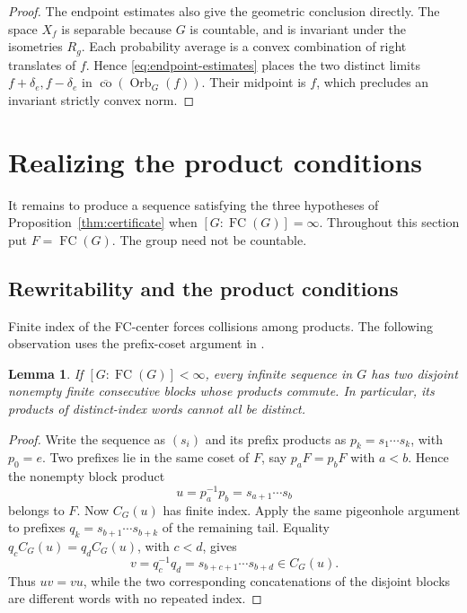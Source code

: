 \documentclass[11pt,letterpaper]{amsart}
\newtheorem{lemma}[theorem]{Lemma}
\theoremstyle{definition}
\theoremstyle{remark}
\DeclareMathOperator{\co}{co}
\DeclareMathOperator{\Orb}{Orb}
\DeclareMathOperator{\FC}{FC}
\begin{document}
\begin{proof}
The endpoint estimates also give the geometric conclusion directly.
The space $X_f$ is separable because $G$ is countable, and is invariant
under the isometries $R_g$. Each probability average is a convex
combination of right translates of $f$. Hence \eqref{eq:endpoint-estimates}
places the two distinct limits $f+\delta_e,f-\delta_e$ in
$\overline{\co}(\Orb_G(f))$. Their midpoint is $f$, which precludes
an invariant strictly convex norm.
\end{proof}

\section{Realizing the product conditions}\label{sec:sequence}
It remains to produce a sequence satisfying the three hypotheses of
Proposition~\ref{thm:certificate} when $[G:\FC(G)]=\infty$.
Throughout this section put $F=\FC(G)$. The group need not be countable.

\subsection{Rewritability and the product conditions}
Finite index of the FC-center forces collisions among products.
The following observation uses the prefix-coset argument in
\cite[Lemmas~3.1--3.2]{BR}.

\begin{lemma}\label{lem:block-commutation}
If $[G:\FC(G)]<\infty$, every infinite sequence in $G$ has two
disjoint nonempty finite consecutive blocks whose products commute.
In particular, its products of distinct-index words cannot all be
distinct.
\end{lemma}
\begin{proof}
Write the sequence as $(s_i)$ and its prefix products as
$p_k=s_1\cdots s_k$, with $p_0=e$. Two prefixes lie in the same
coset of $F$, say $p_aF=p_bF$ with $a<b$. Hence the nonempty block
product
\[
 u=p_a^{-1}p_b=s_{a+1}\cdots s_b
\]
belongs to $F$. Now $C_G(u)$ has finite index. Apply the same
pigeonhole argument to prefixes $q_k=s_{b+1}\cdots s_{b+k}$ of the
remaining tail. Equality $q_cC_G(u)=q_dC_G(u)$, with $c<d$, gives
\[
 v=q_c^{-1}q_d=s_{b+c+1}\cdots s_{b+d}\in C_G(u).
\]
Thus $uv=vu$, while the two corresponding concatenations of the
disjoint blocks are different words with no repeated index.
\end{proof}
\end{document}
